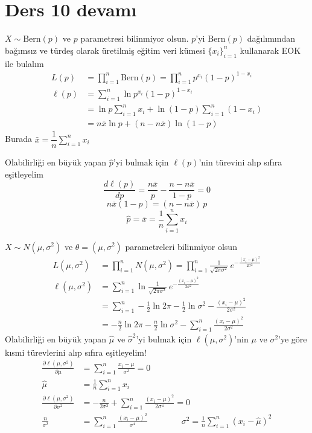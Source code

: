 \documentclass[11pt,a4paper]{article}
\begin{document}
\section{Ders 10 devamı}
\begin{ornek}
  $X\sim\mathrm{Bern}(p)$ ve $p$ parametresi bilinmiyor olsun. $p$'yi $\mathrm{Bern}(p)$ dağılımından bağımsız ve türdeş olarak üretilmiş eğitim veri kümesi $\{x_i\}_{i=1}^{n}$ kullanarak EOK ile bulalım
  \begin{align*}
    L(p) &= \prod_{i=1}^{n}\mathrm{Bern}(p)=\prod_{i=1}^{n}p^{x_i}(1-p)^{1-x_i}\\
    \ell(p) &= \sum_{i=1}^{n}\ln p^{x_i}(1-p)^{1-x_i}\\
    &= \ln p\sum_{i=1}^{n}x_i+\ln(1-p)\sum_{i=1}^{n}(1-x_i)\\
    &= n\bar{x}\ln p+(n-n\bar{x})\ln(1-p)
  \end{align*}
  Burada $\bar{x}=\dfrac{1}{n}\displaystyle\sum_{i=1}^{n}x_i$

  Olabilirliği en büyük yapan $\hat{p}$'yi bulmak için $\ell(p)$'nin türevini alıp sıfıra eşitleyelim
  \[ \frac{d\ell(p)}{dp}=\frac{n\bar{x}}{p}-\frac{n-n\bar{x}}{1-p}=0 \]
  \[ n\bar{x}(1-p)=(n-n\bar{x})\,p \]
  \[ \hat{p}=\bar{x}=\frac{1}{n}\sum_{i=1}^{n}x_i \]
\end{ornek}

\begin{ornek}
  $X\sim N(\mu,\sigma^2)$ ve $\theta=(\mu,\sigma^2)$ parametreleri bilinmiyor olsun
  \begin{align*}
    L(\mu,\sigma^2) &= \prod_{i=1}^{n}N(\mu,\sigma^2)=\prod_{i=1}^{n}\frac{1}{\sqrt{2\pi\sigma^2}}\,e^{-\frac{(x_i-\mu)^2}{2\sigma^2}}\\
    \ell(\mu,\sigma^2) &= \sum_{i=1}^{n}\ln\frac{1}{\sqrt{2\pi\sigma^2}}\,e^{-\frac{(x_i-\mu)^2}{2\sigma^2}}\\
    &= \sum_{i=1}^{n}-\frac{1}{2}\ln 2\pi-\frac{1}{2}\ln\sigma^2-\frac{(x_i-\mu)^2}{2\sigma^2}\\
    &= -\frac{n}{2}\ln 2\pi-\frac{n}{2}\ln\sigma^2-\sum_{i=1}^{n}\frac{(x_i-\mu)^2}{2\sigma^2}
  \end{align*}
  Olabilirliği en büyük yapan $\hat{\mu}$ ve $\hat{\sigma}^2$'yi bulmak için $\ell(\mu,\sigma^2)$'nin $\mu$ ve $\sigma^2$'ye göre kısmi türevlerini alıp sıfıra eşitleyelim!
  \begin{align*}
    \frac{\partial\ell(\mu,\sigma^2)}{\partial\mu} &= \sum_{i=1}^{n}\frac{x_i-\mu}{\sigma^2}=0\\
    \hat{\mu} &= \frac{1}{n}\sum_{i=1}^{n}x_i\\
    \frac{\partial\ell(\mu,\sigma^2)}{\partial\sigma^2} &= -\frac{n}{2\sigma^2}+\sum_{i=1}^{n}\frac{(x_i-\mu)^2}{2\sigma^4}=0\\
    \frac{n}{\sigma^2} &= \sum_{i=1}^{n}\frac{(x_i-\mu)^2}{\sigma^4}\qquad\qquad \sigma^2=\frac{1}{n}\sum_{i=1}^{n}(x_i-\hat{\mu})^2
  \end{align*}
\end{ornek}
\end{document}
